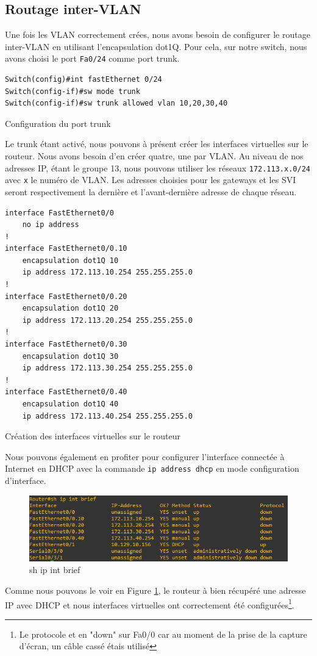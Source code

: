\documentclass{article}
\begin{document}
\subsection{Routage inter-VLAN}
Une fois les VLAN correctement crées, nous avons besoin de configurer le routage inter-VLAN en utilisant l'encapsulation dot1Q.
Pour cela, sur notre switch, nous avons choisi le port \verb|Fa0/24| comme port trunk.
\begin{listing}[H]
    \begin{verbatim}
Switch(config)#int fastEthernet 0/24
Switch(config-if)#sw mode trunk 
Switch(config-if)#sw trunk allowed vlan 10,20,30,40
    \end{verbatim}
    \caption{Configuration du port trunk}
    \label{reseau:switch:trunk}
\end{listing}
Le trunk étant activé, nous pouvons à présent créer les interfaces virtuelles sur le routeur. Nous avons besoin d'en créer quatre, une par VLAN. 
Au niveau de nos adresses IP, étant le groupe 13, nous pouvons utiliser les réseaux \verb|172.113.x.0/24| avec \verb|x| le numéro de VLAN. Les adresses choisies pour les gateways et les SVI seront respectivement la dernière et l'avant-dernière adresse de chaque réseau.
\begin{listing}[H]
    \begin{verbatim}
interface FastEthernet0/0
    no ip address
!
interface FastEthernet0/0.10
    encapsulation dot1Q 10
    ip address 172.113.10.254 255.255.255.0
!
interface FastEthernet0/0.20
    encapsulation dot1Q 20
    ip address 172.113.20.254 255.255.255.0
!
interface FastEthernet0/0.30
    encapsulation dot1Q 30
    ip address 172.113.30.254 255.255.255.0
!
interface FastEthernet0/0.40
    encapsulation dot1Q 40
    ip address 172.113.40.254 255.255.255.0
    \end{verbatim}
    \caption{Création des interfaces virtuelles sur le routeur}
    \label{router:sub-int}
\end{listing}
Nous pouvons également en profiter pour configurer l'interface connectée à Internet en DHCP avec la commande \verb|ip address dhcp| en mode configuration d'interface.
\begin{figure}[H]
    \includegraphics[width=\linewidth]{fig/router-dhcp.png}
    \caption{sh ip int brief}
    \label{router:shipintbrief}
\end{figure}
Comme nous pouvons le voir en Figure \ref{router:shipintbrief}, le routeur à bien récupéré une adresse IP avec DHCP et nous interfaces virtuelles ont correctement été configurées\footnote{Le protocole et en "down" sur Fa0/0 car au moment de la prise de la capture d'écran, un câble cassé étais utilisé}.  
\end{document}
